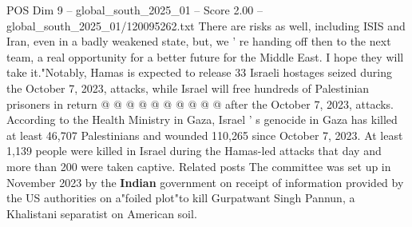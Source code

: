 \begin{textsample}{POS Dim 9 – global\_south\_2025\_01 – Score 2.00 – global\_south\_2025\_01/120095262.txt}
There are risks as well, including ISIS and Iran, even in a badly weakened state, but, we ' re handing off then to the next team, a real opportunity for a better future for the Middle East.
I hope they will take it."Notably, Hamas is expected to release 33 Israeli hostages seized during the October 7, 2023, attacks, while Israel will free hundreds of Palestinian prisoners in return @ @ @ @ @ @ @ @ @ @ after the October 7, 2023, attacks.
According to the Health Ministry in Gaza, Israel ' s genocide in Gaza has killed at least 46,707 Palestinians and wounded 110,265 since October 7, 2023.
At least 1,139 people were killed in Israel during the Hamas-led attacks that day and more than 200 were taken captive.
Related posts The committee was set up in November 2023 by the \textbf{Indian} government on receipt of information provided by the US authorities on a"foiled plot"to kill Gurpatwant Singh Pannun, a Khalistani separatist on American soil.

\end{textsample}
